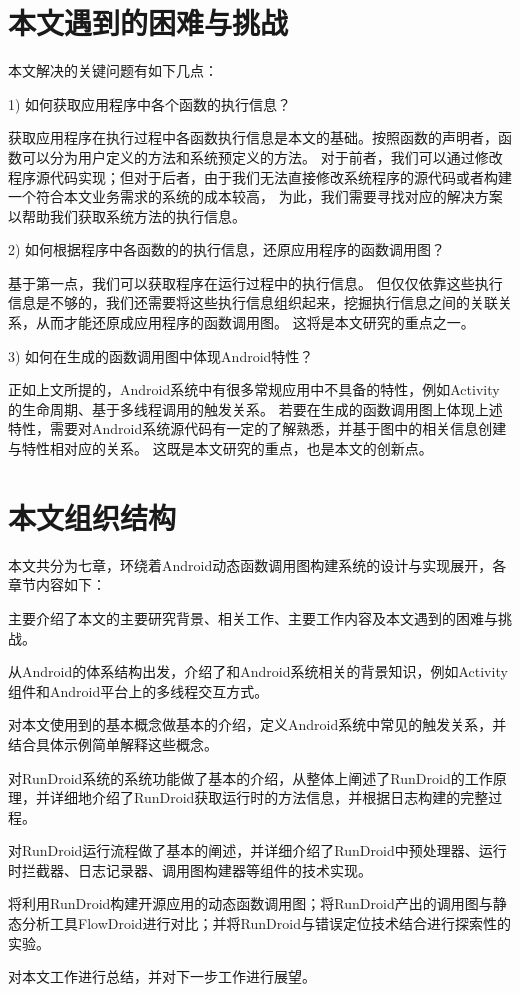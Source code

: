 \section{本文遇到的困难与挑战}


本文解决的关键问题有如下几点：

1)	如何获取应用程序中各个函数的执行信息？

获取应用程序在执行过程中各函数执行信息是本文的基础。按照函数的声明者，函数可以分为用户定义的方法和系统预定义的方法。
对于前者，我们可以通过修改程序源代码实现；但对于后者，由于我们无法直接修改系统程序的源代码或者构建一个符合本文业务需求的系统的成本较高，
为此，我们需要寻找对应的解决方案以帮助我们获取系统方法的执行信息。

2)	如何根据程序中各函数的的执行信息，还原应用程序的函数调用图？

基于第一点，我们可以获取程序在运行过程中的执行信息。
但仅仅依靠这些执行信息是不够的，我们还需要将这些执行信息组织起来，挖掘执行信息之间的关联关系，从而才能还原成应用程序的函数调用图。
这将是本文研究的重点之一。

3)	如何在生成的函数调用图中体现Android特性？

正如上文所提的，Android系统中有很多常规应用中不具备的特性，例如Activity的生命周期、基于多线程调用的触发关系。
若要在生成的函数调用图上体现上述特性，需要对Android系统源代码有一定的了解熟悉，并基于图中的相关信息创建与特性相对应的关系。
这既是本文研究的重点，也是本文的创新点。


\section{本文组织结构}


本文共分为七章，环绕着Android动态函数调用图构建系统的设计与实现展开，各章节内容如下：

主要介绍了本文的主要研究背景、相关工作、主要工作内容及本文遇到的困难与挑战。

从Android的体系结构出发，介绍了和Android系统相关的背景知识，例如Activity组件和Android平台上的多线程交互方式。

对本文使用到的基本概念做基本的介绍，定义Android系统中常见的触发关系，并结合具体示例简单解释这些概念。


对RunDroid系统的系统功能做了基本的介绍，从整体上阐述了RunDroid的工作原理，并详细地介绍了RunDroid获取运行时的方法信息，并根据日志构建\ecg 的完整过程。


对RunDroid运行流程做了基本的阐述，并详细介绍了RunDroid中预处理器、运行时拦截器、日志记录器、调用图构建器等组件的技术实现。

 将利用RunDroid构建开源应用的动态函数调用图；将RunDroid产出的调用图与静态分析工具FlowDroid进行对比；并将RunDroid与错误定位技术结合进行探索性的实验。

对本文工作进行总结，并对下一步工作进行展望。


